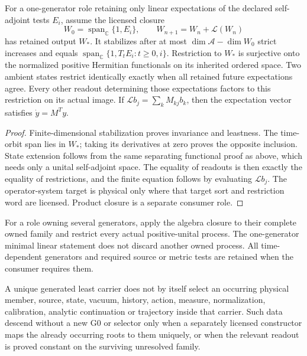 \documentclass[12pt,a4paper]{article}
\begin{document}
\begin{corollary}
\label{p2a:cor:v257-minimal-linear-observations}
For a one-generator role retaining only linear expectations of the
declared self-adjoint tests $E_i$, assume the licensed closure
\[
 W_0=\operatorname{span}_{\mathbb C}\{1,E_i\},\qquad
 W_{n+1}=W_n+\mathcal L(W_n)
\]
has retained output $W_*$. It stabilizes after at most
$\dim\mathcal A-\dim W_0$ strict increases and equals
$\operatorname{span}_{\mathbb C}\{1,T_tE_i:t\ge0,i\}$.
Restriction to $W_*$ is surjective onto the normalized positive Hermitian
functionals on its inherited ordered space. Two ambient states restrict
identically exactly when all retained future expectations agree. Every
other readout determining those expectations factors to this restriction
on its actual image. If
$\mathcal Lb_j=\sum_kM_{kj}b_k$, then the expectation vector satisfies
$\dot y=M^Ty$.
\end{corollary}
\begin{proof}
Finite-dimensional stabilization proves invariance and leastness. The
time-orbit span lies in $W_*$; taking its derivatives at zero proves the
opposite inclusion. State extension follows from the same separating
functional proof as above, which needs only a unital self-adjoint space.
The equality of readouts is then exactly the equality of restrictions,
and the finite equation follows by evaluating $\mathcal Lb_j$.
The operator-system target is physical only where that target sort and
restriction word are licensed. Product closure is a separate consumer role.
\end{proof}
For a role owning several generators, apply the algebra closure to their
complete owned family and restrict every actual positive-unital process.
The one-generator minimal linear statement does not discard another owned
process. All time-dependent generators and required source or metric tests
are retained when the consumer requires them.





\begin{corollary}
\label{p2a:cor:carrier-member-firewall}
A unique generated least carrier does not by itself select an occurring
physical member, source, state, vacuum, history, action, measure,
normalization, calibration, analytic continuation or trajectory inside that
carrier.  Such data descend without a new G0 or selector only when a separately
licensed constructor maps the already occurring roots to them uniquely, or
when the relevant readout is proved constant on the surviving unresolved
family.
\end{corollary}
\end{document}
